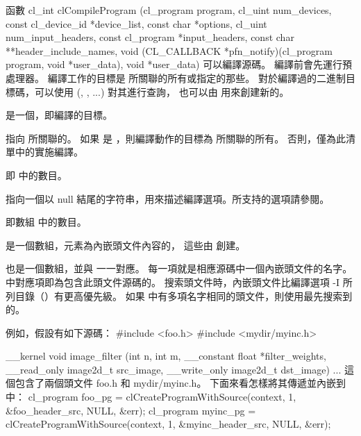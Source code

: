 函數
\startclc
cl_int clCompileProgram (cl_program program,
			cl_uint num_devices,
			const cl_device_id *device_list,
			const char *options,
			cl_uint num_input_headers,
			const cl_program *input_headers,
			const char **header_include_names,
			void (CL_CALLBACK *pfn_notify)(cl_program program,
					void *user_data),
			void *user_data)
\stopclc
可以編譯源碼。
編譯前會先運行預處理器。
編譯工作的目標是  所關聯的所有或指定的那些。
對於編譯過的二進制目標碼，可以使用 (, , ...) 對其進行查詢，
也可以由  用來創建新的。

 是一個，即編譯的目標。

 指向  所關聯的。
如果  是 ，則編譯動作的目標為  所關聯的所有。
否則，僅為此清單中的實施編譯。

 即  中的數目。

 指向一個以 null 結尾的字符串，用來描述編譯選項。所支持的選項請參閱。

 即數組  中的數目。

 是一個數組，元素為內嵌頭文件內容的，
這些由  創建。

 也是一個數組，並與  一一對應。
每一項就是相應源碼中一個內嵌頭文件的名字。
  中對應項即為包含此頭文件源碼的。
搜索頭文件時，內嵌頭文件比編譯選項 -I 所列目錄（）有更高優先級。
如果  中有多項名字相同的頭文件，則使用最先搜索到的。

例如，假設有如下源碼：
\startclc
#include <foo.h>
#include <mydir/myinc.h>

__kernel void image_filter (int n, int m,
			__constant float *filter_weights,
			__read_only image2d_t src_image,
			__write_only image2d_t dst_image)
{
	...
}
\stopclc
這個包含了兩個頭文件 foo.h 和 mydir/myinc.h。
下面來看怎樣將其傳遞並內嵌到中：
\startclc
cl_program foo_pg = clCreateProgramWithSource(context,
				1, &foo_header_src, NULL, &err);
cl_program myinc_pg = clCreateProgramWithSource(context,
				1, &myinc_header_src, NULL, &err);

